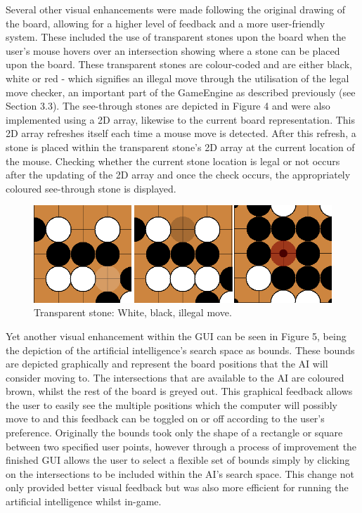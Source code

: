 \documentclass{l3proj}
\begin{document}
Several other visual enhancements were made following the original drawing of the board, allowing for a higher level of feedback and a more user-friendly system. These included the use of transparent stones upon the board when the user's mouse hovers over an intersection showing where a stone can be placed upon the board. These transparent stones are colour-coded and are either black, white or red - which signifies an illegal move through the utilisation of the legal move checker, an important part of the GameEngine as described previously (see Section 3.3). The see-through stones are depicted in Figure 4 and were also implemented using a 2D array, likewise to the current board representation. This 2D array refreshes itself each time a mouse move is detected. After this refresh, a stone is placed within the transparent stone's 2D array at the current location of the mouse. Checking whether the current stone location is legal or not occurs after the updating of the 2D array and once the check occurs, the appropriately coloured see-through stone is displayed.

\begin{figure}[H]
\centering
\includegraphics[scale=0.7]{Images/GUI-4-Transparent.png}
\caption{Transparent stone: White, black, illegal move.}
\end{figure}

Yet another visual enhancement within the GUI can be seen in Figure 5, being the depiction of the artificial intelligence's search space as bounds. These bounds are depicted graphically and represent the board positions that the AI will consider moving to. The intersections that are available to the AI are coloured brown, whilst the rest of the board is greyed out. This graphical feedback allows the user to easily see the multiple positions which the computer will possibly move to and this feedback can be toggled on or off according to the user's preference. Originally the bounds took only the shape of a rectangle or square between two specified user points, however through a process of improvement the finished GUI allows the user to select a flexible set of bounds simply by clicking on the intersections to be included within the AI's search space. This change not only provided better visual feedback but was also more efficient for running the artificial intelligence whilst in-game.
\end{document}
